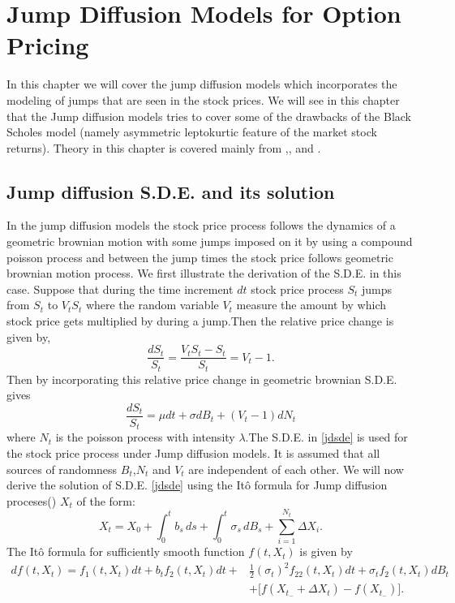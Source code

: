 \documentclass[12pt]{report}
\begin{document}
\chapter{Jump Diffusion Models for Option Pricing}
In this chapter we will cover the jump diffusion models which incorporates the modeling of jumps that are seen in the stock prices. We will see in this chapter that the Jump diffusion models tries to cover some of the drawbacks of the Black Scholes model (namely asymmetric leptokurtic feature of the market stock returns). Theory in this chapter is covered mainly from \cite{matsuda_2017},\cite{tsay_2016}, \cite{cont_tankov_2015} and \cite{campolieti_2014}.

\section{Jump diffusion S.D.E. and its solution}
In the jump diffusion models the stock price process follows the dynamics of a geometric brownian motion with some jumps imposed on it by using a compound poisson process and between the jump times the stock price follows geometric brownian motion process. We first illustrate the derivation of the S.D.E. in this case. Suppose that during the time increment $dt$ stock price process $S_t$ jumps from $S_t$ to $V_tS_t$ where the random variable $V_t$ measure the amount by which stock price gets multiplied by during a jump.Then the relative price change is given by,
$$\frac{dS_t}{S_t} = \frac{V_tS_t - S_t}{S_t} = V_t - 1. $$
Then by incorporating this relative price change in geometric brownian S.D.E. gives
\begin{equation}
  ‎\frac{dS_t}{S_t}=\mu‎‏ ‎dt+\sigma ‎dB_t+(V_t - 1) dN_t ‎  
\label{jdsde}  
\end{equation}
where $N_t$ is the poisson process with intensity $\lambda$.The S.D.E. in \ref{jdsde} is used for the stock price process under Jump diffusion models. It is assumed that all sources of randomness $B_t$,$N_t$ and $V_t$ are independent of each other. We will now derive the solution of S.D.E. \ref{jdsde} using the Itô formula for Jump diffusion proceses(\cite{cont_tankov_2015}) $X_t$ of the form:
$$X_t=X_0+\int_0^t b_s\,ds +\int_0^t \sigma_s \, dB_s + \sum_{i=1}^{N_t} \Delta X_i.$$
The Itô formula for sufficiently smooth function $f(t,X_t)$ is given by
\begin{equation}
\begin{align}
   df(t,X_t) = f_1 (t,X_t) dt+b_t f_2(t,X_t) dt +  &\frac{1}{2} (\sigma_t)^2 f_{22}(t,X_t) dt  + \sigma_t f_2(t,X_t) dB_t\\
   &+ \Big[f(X_{t_{-}} + \Delta X_t) - f(X_{t_{-}})\Big].
\end{align}   
\end{equation}
\end{document}
